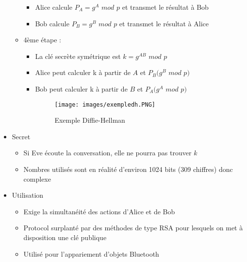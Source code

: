 \documentclass[a4paper]{article}
\begin{document}
\begin{itemize}[label=\textbullet, font=\Large]
\begin{itemize}[label=, font=\scriptsize]
\begin{itemize}
            \item Alice calcule $P_A = g^A$ $mod$ $p$ et transmet le résultat à Bob
            \item Bob calcule $P_B = g^B$ $mod$ $p$ et transmet le résultat à Alice
        \end{itemize}
        \item 4ème étape :
        \begin{itemize}
            \item La clé secrète symétrique est $k = g^{AB}$ $mod$ $p$
            \item Alice peut calculer k à partir de $A$ et $P_B (g^B$ $mod$ $p)$
            \item Bob peut calculer k à partir de $B$ et $P_A (g^A$ $mod$ $p)$
            \begin{figure}[H]
                \centering
                \texttt{[image: images/exempledh.PNG]}
                \caption{Exemple Diffie-Hellman}
            \end{figure}
        \end{itemize}
    \end{itemize}
    \item Secret
    \begin{itemize}[label=, font=\scriptsize]
        \item Si Eve écoute la conversation, elle ne pourra pas trouver $k$
        \item Nombres utilisés sont en réalité d'environ 1024 bits (309 chiffres) donc complexe
    \end{itemize}
    \item Utilisation
    \begin{itemize}[label=, font=\scriptsize]
        \item Exige la simultanéité des actions d'Alice et de Bob
        \item Protocol surplanté par des méthodes de type RSA pour lesquels on met à disposition une clé publique
        \item Utilisé pour l'appariement d'objets Bluetooth
    \end{itemize}
\end{itemize}
\end{document}
